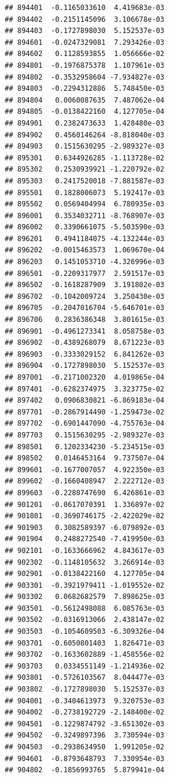 \documentclass[ignorenonframetext,]{beamer}
\begin{document}
\begin{frame}[fragile]
\begin{verbatim}
## 894401  -0.1165033610  4.419683e-03
## 894402  -0.2151145096  3.106678e-03
## 894403  -0.1727898030  5.152537e-03
## 894601  -0.0247329081  7.293426e-03
## 894602   0.1128593855  1.056666e-02
## 894801  -0.1976875378  1.107961e-03
## 894802  -0.3532958604 -7.934827e-03
## 894803  -0.2294312886  5.748450e-03
## 894804   0.0060087635  7.487062e-04
## 894805  -0.0138422160  4.127705e-04
## 894901   0.2382473633  1.428480e-03
## 894902   0.4560146264 -8.818040e-03
## 894903   0.1515630295 -2.989327e-03
## 895301   0.6344926285 -1.113728e-02
## 895302   0.2530939921 -1.220792e-02
## 895303   0.2417520018 -7.881587e-03
## 895501   0.1828006073  5.192417e-03
## 895502   0.0569404994  6.780935e-03
## 896001   0.3534032711 -8.768907e-03
## 896002   0.3390661075 -5.503590e-03
## 896201   0.4941184075 -4.132244e-03
## 896202  -0.0015463573  1.069670e-04
## 896203   0.1451053710 -4.326996e-03
## 896501  -0.2209317977  2.591517e-03
## 896502  -0.1618287909  3.191802e-03
## 896702  -0.1042009724  3.250430e-03
## 896705  -0.2047016704 -5.646701e-03
## 896706   0.2836386348  3.801615e-03
## 896901  -0.4961273341  8.058758e-03
## 896902  -0.4389268079  8.671223e-03
## 896903  -0.3333029152  6.841262e-03
## 896904  -0.1727898030  5.152537e-03
## 897001  -0.2171002320  4.019865e-04
## 897401  -0.6282374975  3.323775e-02
## 897402   0.0906830821 -6.869183e-04
## 897701  -0.2867914490 -1.259473e-02
## 897702  -0.6901447090 -4.755763e-04
## 897703   0.1515630295 -2.989327e-03
## 898501   0.1202334230 -5.234515e-03
## 898502   0.0146453164  9.737507e-04
## 899601  -0.1677007057  4.922350e-03
## 899602  -0.1660408947  2.222712e-03
## 899603  -0.2280747690  6.426861e-03
## 901201  -0.0617070391  1.336897e-02
## 901801  -0.3690746175 -2.422029e-02
## 901903   0.3082589397 -6.079892e-03
## 901904   0.2488272540 -7.419950e-03
## 902101  -0.1633666962  4.843617e-03
## 902302  -0.1148105632  3.266914e-03
## 902901  -0.0138422160  4.127705e-04
## 903301  -0.3921979411 -1.019552e-02
## 903302   0.0682682579  7.898625e-03
## 903501  -0.5612498088  6.085763e-03
## 903502  -0.0316913066  2.438147e-02
## 903503  -0.1054609503 -6.309326e-04
## 903701  -0.6050801403  1.826471e-03
## 903702  -0.1633602889 -1.458556e-02
## 903703   0.0334551149 -1.214936e-02
## 903801  -0.5726103567  8.044477e-03
## 903802  -0.1727898030  5.152537e-03
## 904001  -0.3404613973  9.320753e-03
## 904002  -0.2738192729 -2.148400e-02
## 904501  -0.1229874792 -3.651302e-03
## 904502  -0.3249897396  3.730594e-03
## 904503  -0.2938634950  1.991205e-02
## 904601  -0.8793648793  7.330954e-03
## 904802  -0.1856993765  5.879941e-04

\end{verbatim}
\end{frame}
\end{document}
